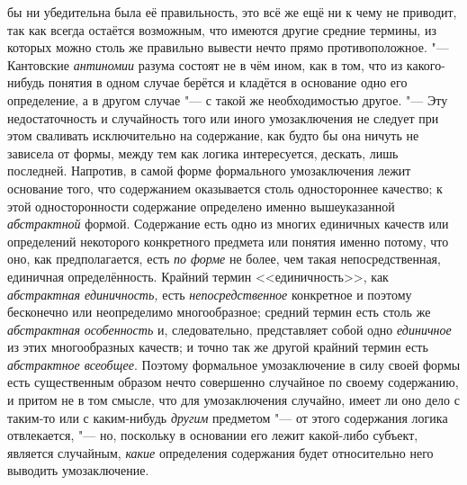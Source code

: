 бы ни убедительна была её правильность, это всё же ещё ни к чему не
приводит, так как всегда остаётся возможным, что имеются другие средние
термины, из которых можно столь же правильно вывести нечто прямо
противоположное. "--- Кантовские
{\em антиномии} разума
состоят не в чём ином, как в том, что из какого-нибудь понятия в одном
случае берётся и кладётся в основание одно его определение, а в другом
случае "--- с такой же необходимостью другое. "---
Эту недостаточность и случайность того или иного
умозаключения не следует при этом сваливать исключительно на содержание,
как будто бы она ничуть не зависела от формы, между тем как логика
интересуется, дескать, лишь последней. Напротив, в самой форме формального
умозаключения лежит основание того, что содержанием оказывается столь
одностороннее качество; к этой односторонности содержание определено именно
вышеуказанной {\em абстрактной}
формой. Содержание есть одно из многих единичных качеств или
определений некоторого конкретного предмета или понятия именно потому, что
оно, как предполагается, есть {\em по
форме} не более, чем такая непосредственная, единичная
определённость. Крайний термин <<единичность>>, как
{\em абстрактная единичность,}
есть
{\em непосредственное}
конкретное и поэтому бесконечно или неопределимо
многообразное; средний термин есть столь же
{\em абстрактная
}{\em особенность} и,
следовательно, представляет собой одно
{\em единичное} из этих
многообразных качеств; и точно так же другой крайний термин есть
{\em абстрактное всеобщее}.
Поэтому формальное умозаключение в силу своей формы есть
существенным образом нечто совершенно случайное по своему содержанию, и
притом не в том смысле, что для умозаключения случайно, имеет ли оно дело с
таким-то или с каким-нибудь
{\em другим} предметом
"--- от этого содержания логика отвлекается, "---
но, поскольку в основании его лежит какой-либо субъект,
является случайным, {\em какие}
определения содержания будет относительно него выводить
умозаключение.

